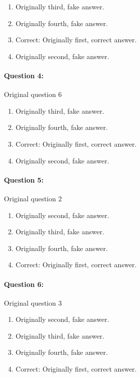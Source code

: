 \documentclass[9pt, twoside, twocolumn]{extarticle}
\begin{document}
\begin{enumerate}[label=\textbf{{\Alph*}},labelindent=0pt, labelsep=1.5em, parsep=0.2em]
\item Originally third, fake answer.
\item Originally fourth, fake answer.
\item Correct: Originally first, correct answer.
\item Originally second, fake answer.
\end{enumerate}
\paragraph{Question 4:}
Original question 6

\begin{enumerate}[label=\textbf{{\Alph*}},labelindent=0pt, labelsep=1.5em, parsep=0.2em]
\item Originally third, fake answer.
\item Originally fourth, fake answer.
\item Correct: Originally first, correct answer.
\item Originally second, fake answer.
\end{enumerate}
\paragraph{Question 5:}
Original question 2

\begin{enumerate}[label=\textbf{{\Alph*}},labelindent=0pt, labelsep=1.5em, parsep=0.2em]
\item Originally second, fake answer.
\item Originally third, fake answer.
\item Originally fourth, fake answer.
\item Correct: Originally first, correct answer.
\end{enumerate}
\paragraph{Question 6:}
Original question 3

\begin{enumerate}[label=\textbf{{\Alph*}},labelindent=0pt, labelsep=1.5em, parsep=0.2em]
\item Originally second, fake answer.
\item Originally third, fake answer.
\item Originally fourth, fake answer.
\item Correct: Originally first, correct answer.
\end{enumerate}
\end{document}
